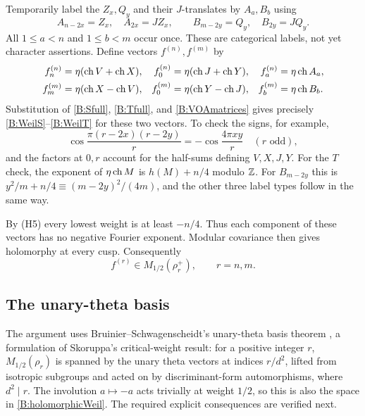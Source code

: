 \documentclass[11pt]{article}
\numberwithin{equation}{section}
\begin{document}
Temporarily label the $Z_x,Q_y$ and their $J$-translates by $A_a,B_b$ using
\[
 A_{n-2x}=Z_x,\quad A_{2x}=JZ_x,\qquad
 B_{m-2y}=Q_y,\quad B_{2y}=JQ_y.
\]
All $1\leq a<n$ and $1\leq b<m$ occur once. These are categorical labels, not yet character assertions. Define vectors $f^{(n)},f^{(m)}$ by
\begin{align*}
 f^{(n)}_n&=\eta(\operatorname{ch} V+\operatorname{ch} X),& f^{(n)}_0&=\eta(\operatorname{ch} J+\operatorname{ch} Y),&
 f^{(n)}_a&=\eta\operatorname{ch} A_a,\\
 f^{(m)}_m&=\eta(\operatorname{ch} X-\operatorname{ch} V),& f^{(m)}_0&=\eta(\operatorname{ch} Y-\operatorname{ch} J),&
 f^{(m)}_b&=\eta\operatorname{ch} B_b.
\end{align*}
Substitution of \eqref{B:Sfull}, \eqref{B:Tfull}, and \eqref{B:VOAmatrices} gives precisely \eqref{B:WeilS}--\eqref{B:WeilT} for these two vectors. To check the signs, for example,
\[
 \cos\frac{\pi(r-2x)(r-2y)}r=-\cos\frac{4\pi xy}r
 \quad(r\text{ odd}),
\]
and the factors at $0,r$ account for the half-sums defining $V,X,J,Y$.
For the $T$ check, the exponent of $\eta\operatorname{ch} M$ is $h(M)+n/4$ modulo $\mathbb Z$.
For $B_{m-2y}$ this is $y^2/m+n/4\equiv(m-2y)^2/(4m)$, and the other three label types follow in the same way.

By (H5) every lowest weight is at least $-n/4$. Thus each component of these vectors has no negative Fourier exponent. Modular covariance then gives holomorphy at every cusp. Consequently
\begin{equation}\label{B:holomorphicWeil}
 f^{(r)}\in M_{1/2}(\rho_r^+),\qquad r=n,m.
\end{equation}

\subsection{The unary-theta basis}
The argument uses Bruinier--Schwagenscheidt's unary-theta basis theorem
\cite[Lemma 2.1]{B:BS}, a formulation of Skoruppa's critical-weight result:
for a positive integer $r$, $M_{1/2}(\rho_r)$ is spanned by the unary theta vectors at indices $r/d^2$, lifted from isotropic subgroups and acted on by discriminant-form automorphisms, where $d^2\mid r$. The involution $a\mapsto-a$ acts trivially at weight $1/2$, so this is also the space in \eqref{B:holomorphicWeil}. The required explicit consequences are verified next.
\end{document}
